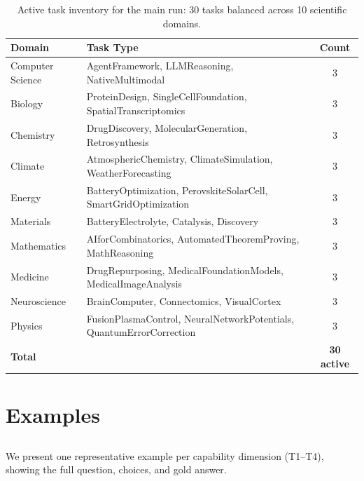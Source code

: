 \begin{table}[h]
\centering
\scriptsize
\caption{Active \genearena{} task inventory for the main run: 30 tasks balanced across 10 scientific domains.}
\label{tab:traces}
\begin{tabular}{p{2.6cm}p{8.1cm}c}
\toprule
\textbf{Domain} & \textbf{Task Type} & \textbf{Count} \\
\midrule
Computer Science & AgentFramework, LLMReasoning, NativeMultimodal & 3 \\
Biology & ProteinDesign, SingleCellFoundation, SpatialTranscriptomics & 3 \\
Chemistry & DrugDiscovery, MolecularGeneration, Retrosynthesis & 3 \\
Climate & AtmosphericChemistry, ClimateSimulation, WeatherForecasting & 3 \\
Energy & BatteryOptimization, PerovskiteSolarCell, SmartGridOptimization & 3 \\
Materials & BatteryElectrolyte, Catalysis, Discovery & 3 \\
Mathematics & AIforCombinatorics, AutomatedTheoremProving, MathReasoning & 3 \\
Medicine & DrugRepurposing, MedicalFoundationModels, MedicalImageAnalysis & 3 \\
Neuroscience & BrainComputer, Connectomics, VisualCortex & 3 \\
Physics & FusionPlasmaControl, NeuralNetworkPotentials, QuantumErrorCorrection & 3 \\
\midrule
\textbf{Total} & & \textbf{30 active} \\
\bottomrule
\end{tabular}
\end{table}

\section{\gene{} Examples}
\label{app:examples}

\subsection{\geneexam{}}
\label{app:ex_exam}

We present one representative example per capability dimension (T1--T4), showing the full question, choices, and gold answer.

